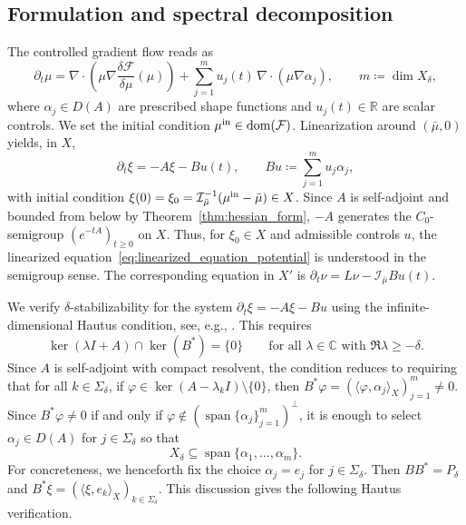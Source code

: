 \documentclass[11pt]{article}
\numberwithin{equation}{section}
\theoremstyle{definition}
\newcommand{\R}{\mathbb{R}}
\newcommand{\C}{\mathbb{C}}
\newcommand{\F}{\mathcal{F}}
\newcommand{\rieszmap}[1][\mu]{\mathcal{I}_{#1}}
\begin{document}
\subsection{Formulation and spectral decomposition}
\label{sec:formulation}

The controlled gradient flow reads as
\begin{equation}
    \label{eq:gradient_flow_controlled}\partial_t\mu = \nabla\cdot\left(\mu\nabla\frac{\delta\F}{\delta\mu}(\mu)\right) + \sum_{j=1}^m u_j(t)\,\nabla\cdot(\mu\nabla\alpha_j), \qquad m \coloneqq \operatorname{dim} X_\delta,
\end{equation}
where $\alpha_j \in D(A)$ are prescribed shape functions and $u_j(t) \in \R$ are scalar controls.
We set the initial condition $\mu^{\rm in} \in \operatorname{dom}(\F)$.
Linearization around $(\bar\mu,0)$ yields, in $X$,
\begin{equation}
    \label{eq:linearized_equation_potential}
    \partial_t \xi = -A\xi - Bu(t), \qquad Bu \coloneqq \sum_{j=1}^m u_j\alpha_j,
\end{equation}
with initial condition $\xi(0) = \xi_0 = \rieszmap[\bar\mu]^{-1}(\mu^{\rm in} - \bar\mu) \in X$.
Since $A$ is self-adjoint and bounded from below by Theorem~\ref{thm:hessian_form}, $-A$ generates the $C_0$-semigroup $(e^{-tA})_{t \ge 0}$ on $X$.
Thus, for $\xi_0 \in X$ and admissible controls $u$, the linearized equation~\eqref{eq:linearized_equation_potential} is understood in the semigroup sense.
The corresponding equation in $X'$ is $\partial_t\nu = L\nu - \rieszmap[\bar\mu] Bu(t)$.

We verify $\delta$-stabilizability for the system $\partial_t\xi = -A\xi - Bu$ using the infinite-dimensional Hautus condition, see, e.g., \cite[Sec.~5.2]{CurtainZwart1995}.
This requires
\[
\ker(\lambda I + A) \cap \ker(B^*) = \{0\} \qquad \text{for all } \lambda \in \C \text{ with } \Re\lambda \ge -\delta.
\]
Since $A$ is self-adjoint with compact resolvent, the condition reduces to requiring that for all $k \in \Sigma_\delta$, if $\varphi \in \ker(A-\lambda_k I)\setminus\{0\}$, then $B^*\varphi = (\langle\varphi, \alpha_j\rangle_X)_{j=1}^m \neq 0$.
Since $B^* \varphi \neq 0$ if and only if $\varphi \notin (\operatorname{span}{\{\alpha_j\}_{j=1}^m})^\perp$, it is enough to select $\alpha_j \in D(A)$ for $j \in \Sigma_\delta$ so that 
\[
X_\delta \subseteq \operatorname{span}\{\alpha_1, \dots, \alpha_m\}.
\]
For concreteness, we henceforth fix the choice $\alpha_j = e_j$ for $j \in \Sigma_\delta$.
Then $B B^* = P_\delta$ and $B^*\xi = (\langle\xi,e_k\rangle_X)_{k \in \Sigma_\delta}$.
This discussion gives the following Hautus verification.
\end{document}
